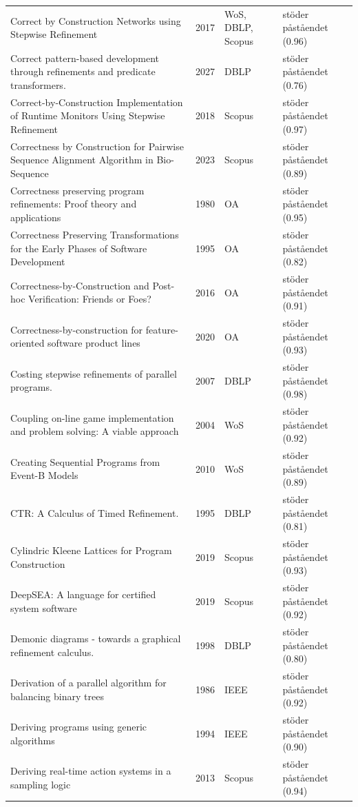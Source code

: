 \begin{longtable}{@{}%
  >{\raggedright\arraybackslash}p{}c%
  >{\raggedright\arraybackslash}p{}%
  >{\raggedright\arraybackslash}p{}@{}}
Correct by Construction Networks using Stepwise Refinement & 2017 & WoS, DBLP, Scopus & stöder påståendet (0.96) \\
Correct pattern-based development through refinements and predicate transformers. & 2027 & DBLP & stöder påståendet (0.76) \\
Correct-by-Construction Implementation of Runtime Monitors Using Stepwise Refinement & 2018 & Scopus & stöder påståendet (0.97) \\
Correctness by Construction for Pairwise Sequence Alignment Algorithm in Bio-Sequence & 2023 & Scopus & stöder påståendet (0.89) \\
Correctness preserving program refinements: Proof theory and applications & 1980 & OA & stöder påståendet (0.95) \\
Correctness Preserving Transformations for the Early Phases of Software Development & 1995 & OA & stöder påståendet (0.82) \\
Correctness-by-Construction and Post-hoc Verification: Friends or Foes? & 2016 & OA & stöder påståendet (0.91) \\
Correctness-by-construction for feature-oriented software product lines & 2020 & OA & stöder påståendet (0.93) \\
Costing stepwise refinements of parallel programs. & 2007 & DBLP & stöder påståendet (0.98) \\
Coupling on-line game implementation and problem solving: A viable approach & 2004 & WoS & stöder påståendet (0.92) \\
Creating Sequential Programs from Event-B Models & 2010 & WoS & stöder påståendet (0.89) \\
CTR: A Calculus of Timed Refinement. & 1995 & DBLP & stöder påståendet (0.81) \\
Cylindric Kleene Lattices for Program Construction & 2019 & Scopus & stöder påståendet (0.93) \\
DeepSEA: A language for certified system software & 2019 & Scopus & stöder påståendet (0.92) \\
Demonic diagrams - towards a graphical refinement calculus. & 1998 & DBLP & stöder påståendet (0.80) \\
Derivation of a parallel algorithm for balancing binary trees & 1986 & IEEE & stöder påståendet (0.92) \\
Deriving programs using generic algorithms & 1994 & IEEE & stöder påståendet (0.90) \\
Deriving real-time action systems in a sampling logic & 2013 & Scopus & stöder påståendet (0.94) \\

\end{longtable}
